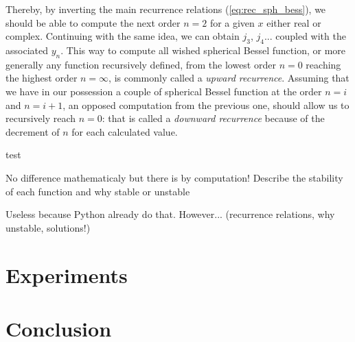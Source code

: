 \documentclass{article}
\numberwithin{equation}{section}
\begin{document}
Thereby, by inverting the main recurrence relations (\ref{eq:rec_sph_bess}), we should be able to compute the next order $n=2$ for a given $x$ either real or complex. Continuing with the same idea, we can obtain $j_{3}$, $j_{4}$... coupled with the associated $y_{n}$. This way to compute all wished spherical Bessel function, or more generally any function recursively defined, from the lowest order $n=0$ reaching the highest order $n=\infty$, is commonly called a \textit{upward recurrence}. Assuming that we have in our possession a couple of spherical Bessel function at the order $n=i$ and $n=i+1$, an opposed computation from the previous one, should allow us to recursively reach $n=0$: that is called a \textit{downward recurrence} because of the decrement of $n$ for each calculated value.

test

No difference mathematicaly but there is by computation! Describe the stability of each function and why stable or unstable

Useless because Python already do that. However... (recurrence relations, why unstable, solutions!)

\section{Experiments}

\section{Conclusion}
\end{document}
